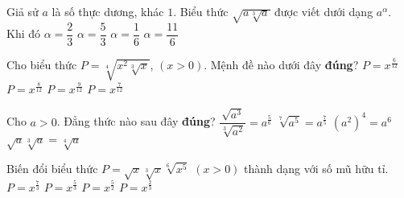 \begin{ex}%
	Giả sử $a$ là số thực dương, khác $1$. Biểu thức $\sqrt{a\sqrt[3]{a}}$ được viết dưới dạng $a^{\alpha}$. Khi đó 
	\choice
	{\True $\alpha=\dfrac{2}{3}$}
	{$\alpha=\dfrac{5}{3}$}
	{$\alpha=\dfrac{1}{6}$}
	{$\alpha=\dfrac{11}{6}$}
\end{ex}
\begin{ex}%
	Cho biểu thức $P=\sqrt[4]{x^2\sqrt[3]{x}}$, $(x>0)$. Mệnh đề nào dưới đây \textbf{đúng}?
	\choice
	{$P=x^{\tfrac{6}{12}}$}
	{$P=x^{\tfrac{8}{12}}$}
	{$P=x^{\tfrac{9}{12}}$}
	{\True $P=x^{\tfrac{7}{12}}$}
\end{ex}
\begin{ex}%
	Cho $a>0$. Đẳng thức nào sau đây \textbf{đúng}?
	\choice
	{\True $\dfrac{\sqrt{a^3}}{\sqrt[3]{a^2}}=a^{\tfrac{5}{6}}$}
	{$\sqrt[7]{a^5}=a^{\tfrac{7}{5}}$}
	{$(a^2)^4=a^6$}
	{$\sqrt{a}\sqrt[3]{a}=\sqrt[4]{a}$}
\end{ex}
\begin{ex}%
	Biến đổi biểu thức $P=\sqrt{x}\sqrt[3]{x}\sqrt[6]{x^5}$ $(x>0)$ thành dạng với số mũ hữu tỉ. 
	\choice
	{$P=x^{\tfrac{7}{3}}$}
	{\True $P=x^{\tfrac{5}{3}}$}
	{$P=x^{\tfrac{5}{2}}$}
	{$P=x^{\tfrac{2}{3}}$}
\end{ex}
